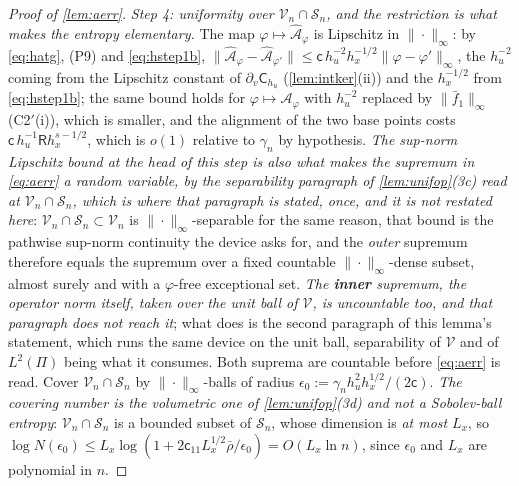 \begin{proof}[Proof of \cref{lem:aerr}]
\emph{Step 4: uniformity over $\mathcal V_n\cap\mathcal S_n$, and the restriction is what makes the
entropy elementary.} The map $\varphi\mapsto\hat{\mathcal A}_\varphi$ is
Lipschitz in $\|\cdot\|_\infty$: by \eqref{eq:hatg}, (P9) and \eqref{eq:hstep1b},
$\|\hat{\mathcal A}_\varphi-\hat{\mathcal A}_{\varphi'}\|\le\mathsf c\,h_u^{-2}h_x^{-1/2}\|\varphi-\varphi'\|_\infty$,
the $h_u^{-2}$ coming from the Lipschitz constant of $\partial_v\mathsf C_{h_u}$
(\cref{lem:intker}(ii)) and the $h_x^{-1/2}$ from \eqref{eq:hstep1b}; the same bound holds for
$\varphi\mapsto\mathcal A_\varphi$ with $h_u^{-2}$ replaced by $\|\bar f_1\|_\infty$ (C2$'$(i)), which
is smaller, and the alignment of the two base points costs $\mathsf c\,h_u^{-1}\mathsf Rh_x^{s-1/2}$,
which is $o(1)$ relative to $\gamma_n$ by hypothesis.
\emph{The sup-norm Lipschitz bound at the head of this step is also what makes the supremum in
\eqref{eq:aerr} a random variable, by the separability paragraph of \cref{lem:unifop}\textup{(3c)} read at
$\mathcal V_n\cap\mathcal S_n$, which is where that paragraph is stated, once, and it is not restated
here}: $\mathcal V_n\cap\mathcal S_n\subset\mathcal V_n$ is $\|\cdot\|_\infty$-separable for the same reason,
that bound is the pathwise sup-norm continuity the device asks for, and the \emph{outer} supremum therefore
equals the
supremum over a fixed countable $\|\cdot\|_\infty$-dense subset, almost surely and with a $\varphi$-free
exceptional set. \emph{The \textbf{inner} supremum, the operator norm itself, taken over the unit ball
of $\mathcal V$, is uncountable too, and that paragraph does not reach it}; what does is the second
paragraph of this lemma's statement, which runs the same device on the unit ball, separability of
$\mathcal V$ and of $L^{2}(\Pi)$ being what it consumes. Both suprema are countable before
\eqref{eq:aerr} is read.
Cover $\mathcal V_n\cap\mathcal S_n$ by
$\|\cdot\|_\infty$-balls of radius $\epsilon_0:=\gamma_nh_u^{2}h_x^{1/2}/(2\mathsf c)$. \emph{The
covering number is the volumetric one of \cref{lem:unifop}(3d) and not a Sobolev-ball entropy}:
$\mathcal V_n\cap\mathcal S_n$ is a bounded subset of $\mathcal S_n$, whose dimension is \emph{at most}
$L_x$, so
$\log N(\epsilon_0)\le L_x\log(1+2\mathsf c_{11}L_x^{1/2}\bar\rho/\epsilon_0)=O(L_x\ln n)$, since
$\epsilon_0$ and $L_x$ are polynomial in $n$.


\end{proof}
